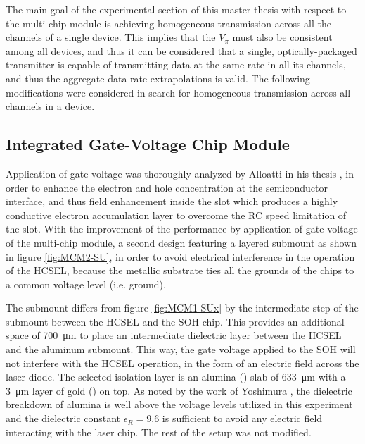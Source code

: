 
The main goal of the experimental section of this master thesis with respect to the multi-chip module is achieving homogeneous transmission across all the channels of a single device. This implies that the $V_\pi$ must also be consistent among all devices, and thus it can be considered that a single, optically-packaged transmitter is capable of transmitting data at the same rate in all its channels, and thus the aggregate data rate extrapolations is valid. The following modifications were considered in search for homogeneous transmission across all channels in a device.

\subsection{Integrated Gate-Voltage Chip Module}

Application of gate voltage was thoroughly analyzed by Alloatti in his thesis \cite{gateAlloatti12}, in order to enhance the electron and hole concentration at the semiconductor interface, and thus field enhancement inside the slot which produces a highly conductive electron accumulation layer to overcome the RC speed limitation of the slot. With the improvement of the performance by application of gate voltage of the multi-chip module, a second design featuring a layered submount as shown in figure \ref{fig:MCM2-SU}, in order to avoid electrical interference in the operation of the HCSEL, because the metallic substrate ties all the grounds of the chips to a common voltage level (i.e. ground). 

The submount differs from figure \ref{fig:MCM1-SUx} by the intermediate step of the submount between the HCSEL and the SOH chip. This provides an additional space of \SI{700}{\micro\meter} to place an intermediate dielectric layer between the HCSEL and the aluminum submount. This way, the gate voltage applied to the SOH will not interfere with the HCSEL operation, in the form of an electric field across the laser diode. The selected isolation layer is an alumina () slab of \SI{633}{\micro\meter} with a \SI{3}{\micro\meter} layer of gold () on top. As noted by the work of Yoshimura \cite{AluminaYoshimura81}, the dielectric breakdown of alumina is well above the voltage levels utilized in this experiment and the dielectric constant $\epsilon_R=9.6$ is sufficient to avoid any electric field interacting with the laser chip. The rest of the setup was not modified.

